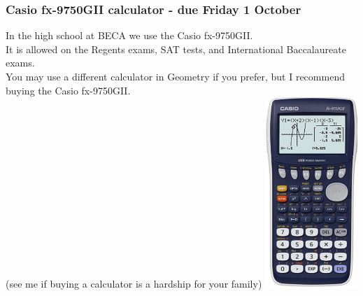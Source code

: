\documentclass{beamer}
\begin{document}
\frame
{
  \frametitle{Casio fx-9750GII calculator - due Friday 1 October}
  \begin{multicols}{2}
  In the high school at BECA we use the Casio fx-9750GII.\\[5pt] 
  It is allowed on the Regents exams, SAT tests, and International Baccalaureate exams.\\[5pt]
  You may use a different calculator in Geometry if you prefer, but I recommend buying the Casio fx-9750GII.\\[5pt]
  (see me if buying a calculator is a hardship for your family)
  \includegraphics[width=3.5cm]{casio_fx-9750GII.png}
  \end{multicols}
}
\end{document}
